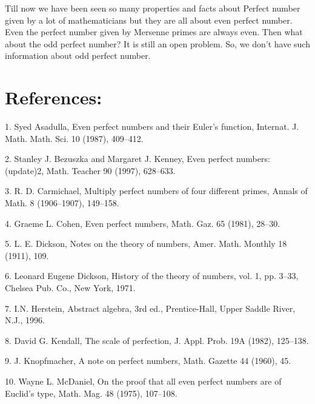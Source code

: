\documentclass[12pt,,a4paper]{book}
\begin{document}
 Till now we have been seen so many properties and facts about Perfect number given by a lot of mathematicians but they are all about even perfect number. Even the perfect number given by Mersenne primes are always even. Then what about the odd perfect number? It is still an open problem. So, we don't have such information about odd perfect number.\\

\clearpage
 
\section*{References:}

\raggedright
\setlength{\itemsep}{0.5em}  %

\item 1. Syed Asadulla, Even perfect numbers and their Euler’s function, Internat. J. Math. Math. Sci. 10 (1987), 409--412.

\item 2. Stanley J. Bezuszka and Margaret J. Kenney, Even perfect numbers: (update)2, Math. Teacher 90 (1997), 628--633.

\item 3. R. D. Carmichael, Multiply perfect numbers of four different primes, Annals of Math. 8 (1906--1907), 149--158.

\item 4. Graeme L. Cohen, Even perfect numbers, Math. Gaz. 65 (1981), 28--30.

\item 5. L. E. Dickson, Notes on the theory of numbers, Amer. Math. Monthly 18 (1911), 109.

\item 6. Leonard Eugene Dickson, History of the theory of numbers, vol. 1, pp. 3--33, Chelsea Pub. Co., New York, 1971.

\item 7. I.N. Herstein, Abstract algebra, 3rd ed., Prentice-Hall, Upper Saddle River, N.J., 1996.

\item 8. David G. Kendall, The scale of perfection, J. Appl. Prob. 19A (1982), 125--138.

\item 9. J. Knopfmacher, A note on perfect numbers, Math. Gazette 44 (1960), 45.

\item 10. Wayne L. McDaniel, On the proof that all even perfect numbers are of Euclid’s type, Math. Mag. 48 (1975), 107--108.
\end{document}
